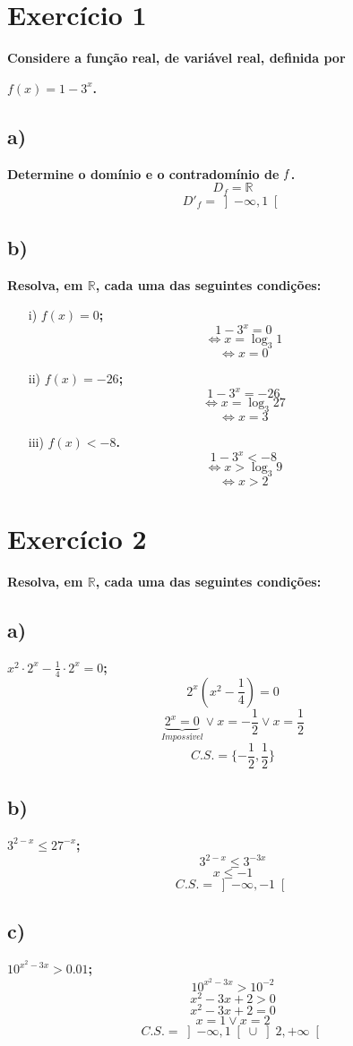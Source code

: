 \documentclass[a4paper]{article}
\begin{document}
	\section*{Exercício 1}\textbf{Considere a função real, de variável real, definida por}
	
	\begin{center}
		\textbf{$f(x) = 1 - 3^x$.}
	\end{center}
	\subsection*{a)}\textbf{Determine o domínio e o contradomínio de $\it{f}$.}
	\[D_{f}=\mathbb{R}\]
	\[D'_{f}= \left]-\infty,1\right[\]
	\subsection*{b)}\textbf{Resolva, em $\mathbb{R}$, cada uma das seguintes condições:}
	\begin{itemize}
		\item[i)] \textbf{$f(x)=0$;}
		\[1-3^x=0\]
		\[\Leftrightarrow x=\log_{3}{1}\]
		\[\Leftrightarrow x=0\]
		\item[ii)] \textbf{$f(x)=-26$;}
		\[1-3^x=-26\]
		\[\Leftrightarrow x=\log_{3}{27}\]
		\[\Leftrightarrow x=3\]
		\item[iii)] \textbf{$f(x)<-8$.}
		\[1-3^x<-8\]
		\[\Leftrightarrow x>\log_{3}{9}\]
		\[\Leftrightarrow x>2\]
	\end{itemize}
	\section*{Exercício 2}\textbf{Resolva, em $\mathbb{R}$, cada uma das seguintes condições:}
	
	\subsection*{a)} \textbf{$x^2 \cdot 2^x - \frac{1}{4} \cdot 2^x =0$;}
	\[2^x\left(x^2-\frac{1}{4}\right)=0\]
	\[\underbrace{2^x=0}_{Impossível} \lor x=-\frac{1}{2} \lor x=\frac{1}{2}\]
	\[C.S.=\{-\frac{1}{2},\frac{1}{2}\}\]
	\subsection*{b)} \textbf{$3^{2-x} \leq 27^{-x}$;}
	\[3^{2-x} \leq 3^{-3x}\]
	\[x \leq -1\]
	\[C.S.=\left]-\infty,-1\right[\]
	
\subsection*{c)} \textbf{$10^{x^2-3x} > 0.01$;}
\[10^{x^2-3x} > 10^{-2}\]
\[x^2-3x + 2 > 0\]
\[x^2-3x + 2=0\]
\[x =1 \lor x=2\]
\[C.S.=\left]-\infty,1\right[\cup\left]2,+\infty\right[\]
\end{document}
